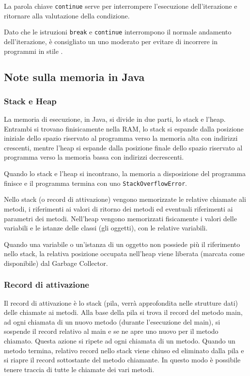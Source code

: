 \documentclass[a4paper]{article}
\begin{document}
La parola chiave \verb|continue| serve per interrompere l'esecuzione dell'iterazione e ritornare alla valutazione della condizione.

Dato che le istruzioni \verb|break| e \verb|continue| interrompono il normale andamento dell'iterazione, è consigliato un uno moderato
per evitare di incorrere in programmi in stile . 

\newpage


\subsection{Note sulla memoria in Java}
\subsubsection*{Stack e Heap}
La memoria di esecuzione, in Java, si divide in due parti, lo stack e l'heap. Entrambi si trovano finisicamente nella RAM, lo stack
si espande dalla posizione iniziale dello spazio riservato al programma verso la memoria alta con indirizzi crescenti, mentre l'heap
si espande dalla posizione finale dello spazio riservato al programma verso la memoria bassa con indirizzi decrescenti.

Quando lo stack e l'heap si incontrano, la memoria a disposizione del programma finisce e il programma termina con uno \verb|StackOverflowError|.

Nello stack (o record di attivazione) vengono memorizzate le relative chiamate ali metodi, i riferimenti ai valori di ritorno dei
metodi ed eventuali riferimenti ai parametri dei metodi. Nell'heap vengono memorizzati fisicamente i valori delle variabili e le
istanze delle classi (gli oggetti), con le relative variabili.

Quando una variabile o un'istanza di un oggetto non possiede più il riferimento nello stack, la relativa posizione occupata nell'heap
viene liberata (marcata come disponibile) dal Garbage Collector.

\subsubsection*{Record di attivazione}
Il record di attivazione è lo stack (pila, verrà approfondita nelle strutture dati) delle chiamate ai metodi.
Alla base della pila si trova il record del metodo main, ad ogni chiamata di un nuovo metodo (durante l'esecuzione del main),
si sospende il record relativo al main e se ne apre uno nuovo per il metodo chiamato. Questa azione si ripete ad ogni chiamata
di un metodo.
Quando un metodo termina, relativo record nello stack viene chiuso ed eliminato dalla pila e si riapre il record sottostante del
metodo chiamante.
In questo modo è possibile tenere traccia di tutte le chiamate dei vari metodi.
\end{document}

